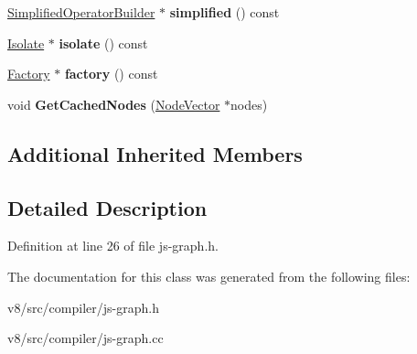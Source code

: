 \begin{DoxyCompactItemize}
\mbox{\hyperlink{classv8_1_1internal_1_1compiler_1_1SimplifiedOperatorBuilder}{Simplified\+Operator\+Builder}} $\ast$ {\bfseries simplified} () const
\item 
\mbox{\label{classv8_1_1internal_1_1compiler_1_1JSGraph_a3cdc4b9f4f26c716107febc5fbcc4d71}} 
\mbox{\hyperlink{classv8_1_1internal_1_1Isolate}{Isolate}} $\ast$ {\bfseries isolate} () const
\item 
\mbox{\label{classv8_1_1internal_1_1compiler_1_1JSGraph_a02461ca9f4cae4050ce7c0c30209fec4}} 
\mbox{\hyperlink{classv8_1_1internal_1_1Factory}{Factory}} $\ast$ {\bfseries factory} () const
\item 
\mbox{\label{classv8_1_1internal_1_1compiler_1_1JSGraph_a2e5ebf52b00b113944ce16a0fafddb20}} 
void {\bfseries Get\+Cached\+Nodes} (\mbox{\hyperlink{classv8_1_1internal_1_1ZoneVector}{Node\+Vector}} $\ast$nodes)
\end{DoxyCompactItemize}
\subsection*{Additional Inherited Members}


\subsection{Detailed Description}


Definition at line 26 of file js-\/graph.\+h.



The documentation for this class was generated from the following files\+:\begin{DoxyCompactItemize}
\item 
v8/src/compiler/js-\/graph.\+h\item 
v8/src/compiler/js-\/graph.\+cc\end{DoxyCompactItemize}
